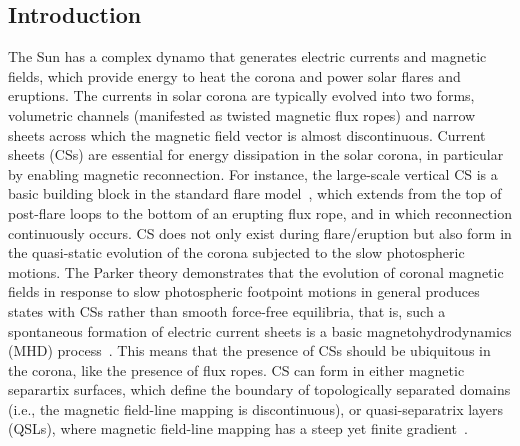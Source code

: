 \documentclass[twocolumn]{aastex6} %
\begin{document}
\begin{CJK*}{UTF8}{gbsn}

\section{Introduction}
\label{sec:intro}

The Sun has a complex dynamo that generates electric currents and
magnetic fields, which provide energy to heat the corona and power solar flares and
eruptions. The currents in solar corona are typically evolved into
two forms, volumetric channels (manifested as twisted magnetic flux
ropes) and narrow sheets across which the magnetic field vector is
almost discontinuous. Current sheets (CSs) are essential for energy
dissipation in the solar corona, in particular by enabling magnetic
reconnection. For instance, the large-scale vertical CS is a basic
building block in the standard flare model~\citep{LinJ2015}, which
extends from the top of post-flare loops to the bottom of an erupting
flux rope, and in which reconnection continuously occurs.
CS does not only exist during flare/eruption but also form in
the quasi-static evolution of the corona subjected to the slow
photospheric motions. The Parker theory demonstrates that the
evolution of coronal magnetic fields in response to slow photospheric
footpoint motions in general produces states with CSs rather than
smooth force-free equilibria, that is, such a spontaneous formation of
electric current sheets is a basic magnetohydrodynamics (MHD)
process~\citep{Parker1972, Parker1994, LowBC1996, Low2005,
  Low2010}. {This means that the presence of CSs should be ubiquitous in the corona, like
  the presence of flux ropes.} CS can form in either magnetic separartix surfaces, which
define the boundary of topologically separated domains (i.e., the
magnetic field-line mapping is discontinuous), or quasi-separatrix
layers (QSLs), where magnetic field-line mapping has a steep yet
finite gradient~\citep{Demoulin2006, Aulanier2006}.



\end{CJK*}
\end{document}
